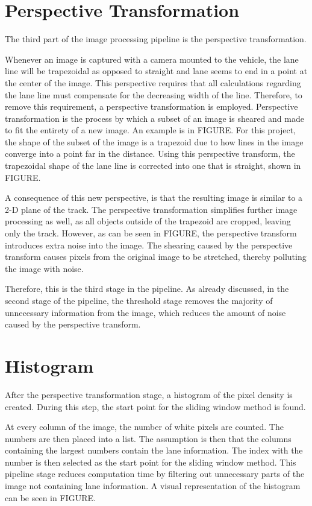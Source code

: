 \documentclass[arbeit=studie,oneside,BCOR=12mm]{ArbeitRST}
\begin{document}
\section{Perspective Transformation}

The third part of the image processing pipeline is the perspective 
transformation. 

Whenever an image is captured with a camera mounted to the vehicle, the lane
line will be trapezoidal as opposed to straight and lane seems to end in a
point at the center of the image. This perspective requires that all
calculations regarding the lane line must compensate for the decreasing width
of the line. Therefore, to remove this requirement, a perspective
transformation is employed. Perspective transformation is the process by which
a subset of an image is sheared and made to fit the entirety of a new image. An
example is in FIGURE. For this project, the shape of the subset of the image is
a trapezoid due to how lines in the image converge into a point far in the
distance. Using this perspective transform, the trapezoidal shape of the lane
line is corrected into one that is straight, shown in FIGURE.

A consequence of this new perspective, is that the resulting image is similar
to a 2-D plane of the track. The perspective transformation simplifies further
image processing as well, as all objects outside of the trapezoid are cropped,
leaving only the track. However, as can be seen in FIGURE, the perspective
transform introduces extra noise into the image. The shearing caused by the
perspective transform causes pixels from the original image to be stretched,
thereby polluting the image with noise. 

Therefore, this is the third stage in the pipeline. As already discussed, in 
the second stage of the pipeline, the threshold stage removes the majority of 
unnecessary information from the image, which reduces the amount of noise 
caused by the perspective transform.

\section{Histogram}

After the perspective transformation stage, a histogram of the pixel density 
is created. During this step, the start point for the sliding window method is
found. 

At every column of the image, the number of white pixels are counted. 
The numbers are then placed into a list. The assumption is then that the 
columns containing the largest numbers contain the lane information. The 
index with the number is then selected as the start point for the sliding 
window method. This pipeline stage reduces computation time by filtering out 
unnecessary parts of the image not containing lane information. A visual 
representation of the histogram can be seen in FIGURE.
\end{document}
